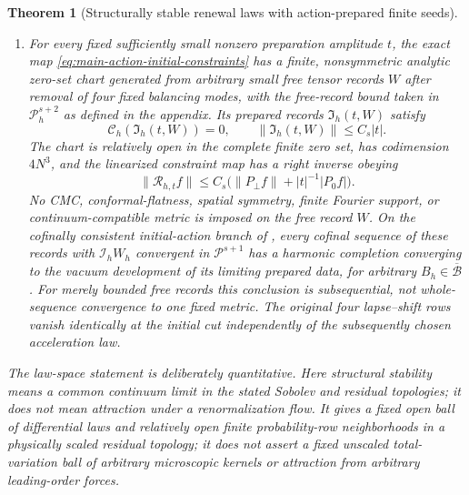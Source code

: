 \documentclass[11pt]{article}
\newtheorem{theorem}{Theorem}[section]
\numberwithin{equation}{section}
\theoremstyle{definition}
\theoremstyle{remark}
\begin{document}
\begin{theorem}[Structurally stable renewal laws with action-prepared finite seeds]
\begin{enumerate}[label=\textup{(L\arabic*)},leftmargin=3em]
      For a fixed finite grammar containing a sufficiently accurate completion
      at every live source, the strict conditions
      \eqref{eq:main-law-row-moment} form nonempty relatively open convex
      subsets of the product of row simplexes and may contain strictly
      positive rows. The construction in 
      supplies the required strict residual margin.  Along the odd refinement sequence the exceptional
      probabilities are summable, so under any common coupling the Einstein
      conclusion holds eventually almost surely.
\item For every fixed sufficiently small nonzero preparation amplitude $t$,
      the exact map \eqref{eq:main-action-initial-constraints} has a finite,
      nonsymmetric analytic zero-set chart generated from arbitrary small free
      tensor records $W$ after removal of four fixed balancing modes, with
      the free-record bound taken in $\mathcal P_h^{s+2}$ as defined in the appendix. Its
      prepared records $\mathfrak I_h(t,W)$ satisfy
      \begin{equation}
       \mathscr C_h(\mathfrak I_h(t,W))=0,\qquad
       \|\mathfrak I_h(t,W)\|\le C_s|t|.
       \label{eq:main-action-prepared-zero}
      \end{equation}
      The chart is relatively open in the complete finite zero set, has
      codimension $4N^3$, and the linearized constraint map has a right inverse
      obeying
      \begin{equation}
       \|\mathscr R_{h,t}f\|
       \le C_s\bigl(\|P_\perp f\|+|t|^{-1}|P_0f|\bigr).
       \label{eq:main-action-prepared-inverse}
      \end{equation}
      No CMC, conformal-flatness, spatial symmetry, finite Fourier support, or
      continuum-compatible metric is imposed on the free record $W$.
      On the cofinally consistent initial-action branch of
      , every cofinal sequence of these
      records with $\mathcal I_hW_h$ convergent in $\mathcal P^{s+1}$
      has a harmonic completion converging to the vacuum development of
      its limiting prepared data, for arbitrary
      $B_h\in\overline{\mathcal B}$. For merely bounded free records
      this conclusion is subsequential, not whole-sequence convergence
      to one fixed metric. The original four lapse--shift rows vanish
      identically at the initial cut independently of the subsequently
      chosen acceleration law.
\end{enumerate}
The law-space statement is deliberately quantitative. Here structural
stability means a common continuum limit in the stated Sobolev and residual
topologies; it does not mean attraction under a renormalization flow.  It gives a fixed open
ball of differential laws and relatively open finite probability-row
neighborhoods in a physically scaled residual topology; it does not assert a
fixed unscaled total-variation ball of arbitrary microscopic kernels or
attraction from arbitrary leading-order forces.
\end{theorem}
\end{document}
